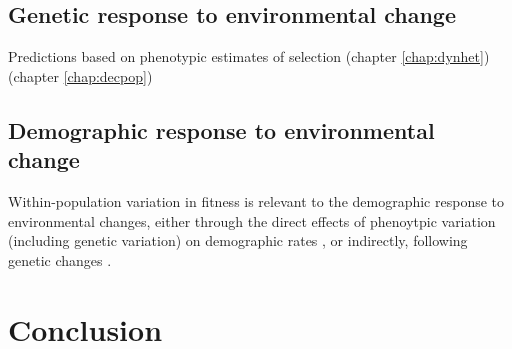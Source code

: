\subsection{Genetic response to environmental change}
Predictions based on phenotypic estimates of selection
(chapter \ref{chap:dynhet})
(chapter \ref{chap:decpop})

\subsection{Demographic response to environmental change}
Within-population variation in fitness is relevant to the demographic response to environmental changes, either through the direct effects of phenoytpic variation (including genetic variation) on demographic rates \parencite{Kendall2011, vindenes2015, Plard2016}, or indirectly, following genetic changes \parencite{Chevin2010a, Turcotte2011, Schiffers2013a}. 

\section{Conclusion}


\printbibliography[heading=subbibliography]

